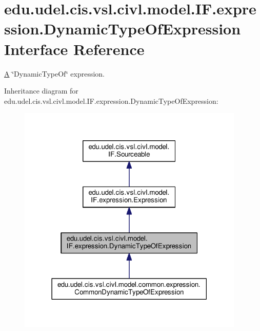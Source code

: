 \hypertarget{interfaceedu_1_1udel_1_1cis_1_1vsl_1_1civl_1_1model_1_1IF_1_1expression_1_1DynamicTypeOfExpression}{}\section{edu.\+udel.\+cis.\+vsl.\+civl.\+model.\+I\+F.\+expression.\+Dynamic\+Type\+Of\+Expression Interface Reference}
\label{interfaceedu_1_1udel_1_1cis_1_1vsl_1_1civl_1_1model_1_1IF_1_1expression_1_1DynamicTypeOfExpression}


\hyperlink{structA}{A} \char`\"{}\+Dynamic\+Type\+Of\char`\"{} expression.  




Inheritance diagram for edu.\+udel.\+cis.\+vsl.\+civl.\+model.\+I\+F.\+expression.\+Dynamic\+Type\+Of\+Expression\+:
\nopagebreak
\begin{figure}[H]
\begin{center}
\leavevmode
\includegraphics[width=306pt]{interfaceedu_1_1udel_1_1cis_1_1vsl_1_1civl_1_1model_1_1IF_1_1expression_1_1DynamicTypeOfExpression__inherit__graph}
\end{center}
\end{figure}


